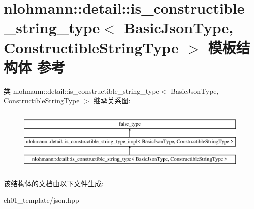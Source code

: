 \hypertarget{structnlohmann_1_1detail_1_1is__constructible__string__type}{}\section{nlohmann\+::detail\+::is\+\_\+constructible\+\_\+string\+\_\+type$<$ Basic\+Json\+Type, Constructible\+String\+Type $>$ 模板结构体 参考}
\label{structnlohmann_1_1detail_1_1is__constructible__string__type}
类 nlohmann\+::detail\+::is\+\_\+constructible\+\_\+string\+\_\+type$<$ Basic\+Json\+Type, Constructible\+String\+Type $>$ 继承关系图\+:\begin{figure}[H]
\begin{center}
\leavevmode
\includegraphics[height=3.000000cm]{structnlohmann_1_1detail_1_1is__constructible__string__type}
\end{center}
\end{figure}


该结构体的文档由以下文件生成\+:\begin{DoxyCompactItemize}
\item 
ch01\+\_\+template/json.\+hpp\end{DoxyCompactItemize}
